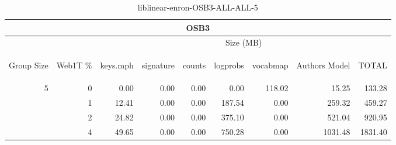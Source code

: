 \begin{center}
\begin{table}[htbp]
\begin{tabular}{ | r | r | r | r | r | r | r | r | r |}
\hline
\multicolumn{9}{|c|}{OSB3}\\
\hline
 & & \multicolumn{7}{|c|}{Size (MB)}\\ \cline{3-9}
\begin{sideways}Group Size\end{sideways} & \begin{sideways}Web1T \% \end{sideways} & \begin{sideways}keys.mph\end{sideways} & \begin{sideways}signature\end{sideways} & \begin{sideways}counts\end{sideways} & \begin{sideways}logprobs\end{sideways} & \begin{sideways}vocabmap\end{sideways} & \begin{sideways}Authors Model \end{sideways} & \begin{sideways}TOTAL\end{sideways}\\
\hline
\multirow{3}{*}{5}
 & 0 & 0.00 & 0.00 & 0.00 & 0.00 & 118.02 & 15.25 & 133.28\\ \cline{2-9}
 & 1 & 12.41 & 0.00 & 0.00 & 187.54 & 0.00 & 259.32 & 459.27\\ \cline{2-9}
 & 2 & 24.82 & 0.00 & 0.00 & 375.10 & 0.00 & 521.04 & 920.95\\ \cline{2-9}
 & 4 & 49.65 & 0.00 & 0.00 & 750.28 & 0.00 & 1031.48 & 1831.40\\ \cline{2-9}
\hline
\end{tabular}
\caption{liblinear-enron-OSB3-ALL-ALL-5}
\label{table:liblinear-enron-OSB3-ALL-ALL-5}
\end{table}
\end{center}

